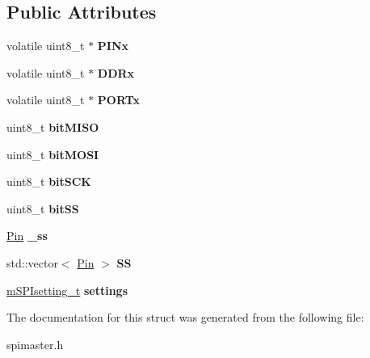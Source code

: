 \subsection*{Public Attributes}
\begin{DoxyCompactItemize}
\item 
\mbox{\label{structmasterSPI__t_a69f13d6f82316cbad3e05aa1067c25ab}} 
volatile uint8\+\_\+t $\ast$ {\bfseries P\+I\+Nx}
\item 
\mbox{\label{structmasterSPI__t_a24aa73fb35508a28c63f1fad2f3548dc}} 
volatile uint8\+\_\+t $\ast$ {\bfseries D\+D\+Rx}
\item 
\mbox{\label{structmasterSPI__t_a819eae46f1e853b89ac501081cb1c2e9}} 
volatile uint8\+\_\+t $\ast$ {\bfseries P\+O\+R\+Tx}
\item 
\mbox{\label{structmasterSPI__t_a9265e0ac3fe401504361a960fce3eb78}} 
uint8\+\_\+t {\bfseries bit\+M\+I\+SO}
\item 
\mbox{\label{structmasterSPI__t_acfbd932e92c901306860214a154e383b}} 
uint8\+\_\+t {\bfseries bit\+M\+O\+SI}
\item 
\mbox{\label{structmasterSPI__t_af26928ddc81c31b6b66dd473d6c63c4c}} 
uint8\+\_\+t {\bfseries bit\+S\+CK}
\item 
\mbox{\label{structmasterSPI__t_a7238d1be10b3bf5e15fd9786d09b3b3f}} 
uint8\+\_\+t {\bfseries bit\+SS}
\item 
\mbox{\label{structmasterSPI__t_a49ce53c491227c03ddb088bf918437d2}} 
\hyperlink{classPin}{Pin} {\bfseries \+\_\+ss}
\item 
\mbox{\label{structmasterSPI__t_ad0195c06fe173b42b66d9169ba1d15df}} 
std\+::vector$<$ \hyperlink{classPin}{Pin} $>$ {\bfseries SS}
\item 
\mbox{\label{structmasterSPI__t_ae2c1bb02c7d7b80d2fff99eacf108eb0}} 
\hyperlink{structmSPIsetting__t}{m\+S\+P\+Isetting\+\_\+t} {\bfseries settings}
\end{DoxyCompactItemize}


The documentation for this struct was generated from the following file\+:\begin{DoxyCompactItemize}
\item 
spimaster.\+h\end{DoxyCompactItemize}
